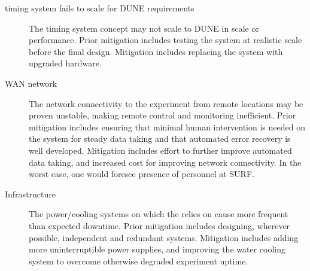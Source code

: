 \begin{description}


\item[ timing system fails to scale for DUNE requirements] The  timing system concept may
  not scale to DUNE in scale or performance.  Prior mitigation
  includes testing the system at realistic scale before the final
  design. Mitigation includes replacing the system with upgraded
  hardware.


\item[WAN network] The network connectivity to the experiment from
  remote locations may be proven unstable, making remote control and monitoring
  inefficient. Prior mitigation includes ensuring that minimal human intervention
  is needed on the system for steady data taking and that automated
  error recovery is well developed. Mitigation includes effort to further
  improve automated data taking, and increased cost for improving network
  connectivity. In the worst case, one would foresee presence of personnel at SURF.

\item[Infrastructure] The power/cooling systems on which the 
  relies on cause more frequent than expected downtime. Prior
  mitigation includes designing, wherever possible, independent and redundant
  systems. Mitigation includes adding more uninterruptible power
  supplies, and improving the water cooling system to overcome otherwise
  degraded experiment uptime. 


\end{description}

